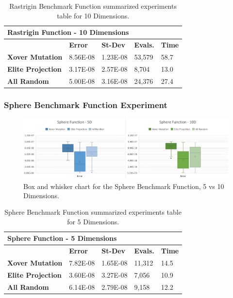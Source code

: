\documentclass[graybox]{svmult}
\begin{document}
\begin{table}[]
    \scriptsize
    \centering
    \caption{Rastrigin Benchmark Function summarized experiments table for 10 Dimensions.}\label{tab.fun_rastrigin10}
    \begin{tabular}{@{}lllll@{}}
    \toprule
    \multicolumn{5}{l}{\textbf{Rastrigin Function - 10   Dimensions}} \\ \midrule
     & \textbf{Error} & \textbf{St-Dev} & \textbf{Evals.} & \textbf{Time} \\
    \textbf{Xover Mutation} & 8.56E-08 & 1.23E-08 & 53,579 & 58.7 \\
    \textbf{Elite Projection} & 3.17E-08 & 2.57E-08 & 8,704 & 13.0 \\
    \textbf{All Random} & 5.00E-08 & 3.16E-08 & 24,376 & 27.4 \\ \bottomrule
    \end{tabular}
    \end{table}


\subsubsection{Sphere Benchmark Function Experiment}

\begin{figure}
    \includegraphics[width=\linewidth, frame]{img/fig_fun_sphere.pdf}
    \caption{Box and whisker chart for the Sphere Benchmark Function, 5 vs 10 Dimensions.} \label{fig.fun_sphere}
    \end{figure}

\begin{table}[]
    \scriptsize
    \centering
    \caption{Sphere Benchmark Function summarized experiments table for 5 Dimensions.}\label{tab.fun_sphere5}
    \begin{tabular}{@{}lllll@{}}
    \toprule
    \multicolumn{5}{l}{\textbf{Sphere Function - 5 Dimensions}} \\ \midrule
     & \textbf{Error} & \textbf{St-Dev} & \textbf{Evals.} & \textbf{Time} \\
    \textbf{Xover Mutation} & 7.82E-08 & 1.65E-08 & 11,312 & 14.5 \\
    \textbf{Elite Projection} & 3.60E-08 & 3.27E-08 & 7,056 & 10.9 \\
    \textbf{All Random} & 6.14E-08 & 2.79E-08 & 9,158 & 12.2 \\ \bottomrule
    \end{tabular}
    \end{table}
\end{document}
